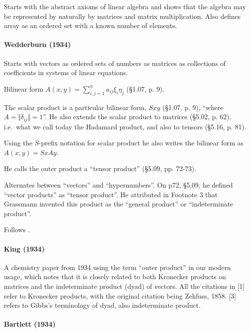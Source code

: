Starts with the abstract axioms of linear algebra and shows that the algebra
may be represented by naturally by matrices and matrix multiplication. Also
defines array as an ordered set with a known number of elements.

\paragraph{Wedderburn (1934)~\cite{Wedderburn1934}}

Starts with vectors as ordered sets of numbers as matrices as collections of
coefficients in systems of linear equations.

Bilinear form $A(x, y) = \sum^n_{i,j=1} a_{ij} \xi_i \eta_j $ (\S 1.07, p. 9).

The scalar product is a particular bilinear form, $S x y$ (\S 1.07, p. 9),
``where $A = \Vert \delta_{ij} \Vert = 1$''. He also extends the scalar product
to matrices (\S 5.02, p. 62), i.e.\ what we call today the Hadamard product, and
also to tensors (\S 5.16, p. 81).

Using the $S$-prefix notation for scalar product he also writes the bilinear
form as $A(x, y) = SxAy$.

He calls the outer product a ``tensor product'' (\S 5.09, pp. 72-73).

Alternates between ``vectors'' and ``hypernumbers''. On p72, \S 5.09, he
defined ``vector products'' as ``tensor product''. He attributed in Footnote 3
that Grassmann invented this product as the ``general product'' or
``indeterminate product''.

Follows \cite{Scheffers1889}.



\paragraph{King (1934)}

A chemistry paper from 1934 using the term ``outer product'' in
our modern usage, which notes that it is closely related to both Kronecker
products on matrices and the indeterminate product (dyad) of vectors. All the
citations in [1] refer to Kronecker products, with the original citation being
Zehfuss, 1858. [3] refers to Gibbs's terminology of dyad, also indeterminate
product.



\paragraph{Bartlett (1934)}

